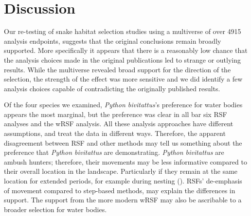\documentclass[10pt,a4paper]{article}
\begin{document}
\section{Discussion}\label{discussion}

Our re-testing of snake habitat selection studies using a multiverse of over 4915 analysis endpoints, suggests that the original conclusions remain broadly supported.
More specifically it appears that there is a reasonably low chance that the analysis choices made in the original publications led to strange or outlying results.
While the multiverse revealed broad support for the direction of the selection, the strength of the effect was more sensitive and we did identify a few analysis choices capable of contradicting the originally published results.

Of the four species we examined, \emph{Python bivitattus}'s preference for water bodies appears the most marginal, but the preference was clear in all bar six RSF analyses and the wRSF analysis.
All these analysis approaches have different assumptions, and treat the data in different ways.
Therefore, the apparent disagreement between RSF and other methods may tell us something about the preference that \emph{Python bivitattus} are demonstrating.
\emph{Python bivitattus} are ambush hunters; therefore, their movements may be less informative compared to their overall location in the landscape.
Particularly if they remain at the same location for extended periods, for example during nesting ().
RSFs' de-emphasis of movement compared to step-based methods, may explain the differences in support.
The support from the more modern wRSF may also be ascribable to a broader selection for water bodies.
\end{document}
